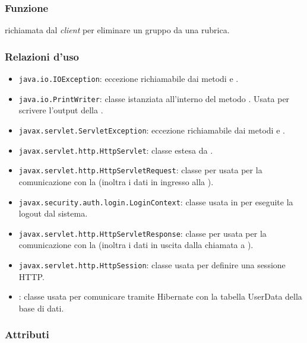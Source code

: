 

\subsubsection*{Funzione}
 richiamata dal \textit{client} per eliminare un gruppo da una rubrica.

\subsubsection*{Relazioni d'uso}

\begin{itemize}
	\item \texttt{java.io.IOException}: eccezione richiamabile dai metodi  e .
	\item \texttt{java.io.PrintWriter}: classe istanziata all'interno del metodo . Usata per scrivere l'output della .
	\item \texttt{javax.servlet.ServletException}: eccezione richiamabile dai metodi  e .
	\item \texttt{javax.servlet.http.HttpServlet}: classe estesa da .
	\item \texttt{javax.servlet.http.HttpServletRequest}:  classe per usata per la comunicazione con la  (inoltra i dati in ingresso alla ).
	\item \texttt{javax.security.auth.login.LoginContext}: classe usata in  per eseguite la logout dal sistema.
	\item \texttt{javax.servlet.http.HttpServletResponse}: classe per usata per la comunicazione con la  (inoltra i dati in uscita dalla chiamata a ).
	\item \texttt{javax.servlet.http.HttpSession}: classe usata per definire una sessione HTTP.
	\item {}: classe usata per comunicare tramite Hibernate con la tabella UserData della base di dati.
\end{itemize}

\subsubsection*{Attributi}

